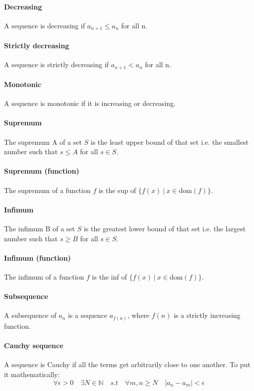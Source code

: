\documentclass{article}
\newcommand{\N}{\mathbb{N}}
\begin{document}
\paragraph{Decreasing}
A sequence is decreasing if $ a_{n + 1} \leq a_{n} $ for all n.
\paragraph{Strictly decreasing}
A sequence is strictly decreasing if $ a_{n + 1} < a_{n} $ for all n.
\paragraph{Monotonic}
A sequence is monotonic if it is increasing or decreasing.
\paragraph{Supremum}
The supremum A of a set $ S $ is the least upper bound of that set i.e. the smallest number such that $ s \leq A $ for all $ s \in S $.
\paragraph{Supremum (function)}
The supremum of a function $ f $ is the sup of $ \{f(x) \ | \ x \in \textrm{dom}(f)\} $.
\paragraph{Infimum}
The infimum B of a set $ S $ is the greatest lower bound of that set i.e. the largest number such that $ s \geq B $ for all $ s \in S $.
\paragraph{Infimum (function)}
The infimum of a function $ f $ is the inf of $ \{f(x) \ | \ x \in \textrm{dom}(f)\} $.
\paragraph{Subsequence}
A subsequence of $ a_{n} $ is a sequence $ a_{f(n)} $, where $ f(n) $ is a strictly increasing function.
\paragraph{Cauchy sequence}
A sequence is Cauchy if all the terms get arbitrarily close to one another. To put it mathematically:
\begin{equation}
\forall \epsilon > 0 \quad \exists N \in \N \quad s.t \quad \forall m,n \geq N \quad |a_{n} - a_{m}| < \epsilon
\end{equation}
\end{document}
